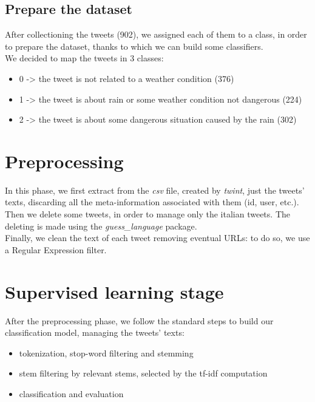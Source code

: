 \documentclass[a4paper]{article}
\begin{document}
\subsection{Prepare the dataset}
After collectioning the tweets (902), we assigned each of them to a class, in order to prepare the dataset, thanks to which we can build some classifiers.\\
We decided to map the tweets in 3 classes:
\begin{itemize}
\item 0 -> the tweet is not related to a weather condition (376)
\item 1 -> the tweet is about rain or some weather condition not dangerous (224)
\item 2 -> the tweet is about some dangerous situation caused by the rain (302)
\end{itemize}

\section{Preprocessing}
In this phase, we first extract from the \textit{csv} file, created by \emph{twint}, just the tweets' texts, discarding all the meta-information associated with them (id, user, etc.).\\
Then we delete some tweets, in order to manage only the italian tweets. The deleting is made using the \textit{guess\_language} package.\\
Finally, we clean the text of each tweet removing eventual URLs: to do so, we use a Regular Expression filter.

\section{Supervised learning stage}
After the preprocessing phase, we follow the standard steps to build our classification model, managing the tweets' texts:
\begin{itemize}
\item tokenization, stop-word filtering and stemming
\item stem filtering by relevant stems, selected by the tf-idf computation
\item classification and evaluation
\end{itemize}
\end{document}
